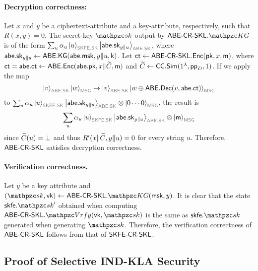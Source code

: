 \paragraph{Decryption correctness:}
Let $x$ and $y$ be a ciphertext-attribute and a key-attribute,
respectively, such that $R(x,y)=0$. The secret-key
$\qsk$ output by $\ABESKL.\qKG$ is of the form $\sum_u \alpha_u
\ket{u}_{\qreg{SKFE.SK}}\ket{\abe.\sk_{y\|u}}_{\qreg{ABE.SK}}$,
where $\mathsf{abe}.\mathsf{sk}_{y\|u}\leftarrow\mathsf{ABE}.\mathsf{KG}(\mathsf{abe}.\mathsf{msk},y\|u,\mathsf{k})$.
Let $\mathsf{ct}\leftarrow\mathsf{ABE}\textrm{-}\mathsf{CR}\textrm{-}\mathsf{SKL}.\mathsf{Enc}(\mathsf{pk},x,\mathsf{m})$, where
$\mathsf{ct}=\mathsf{abe}.\mathsf{ct}\leftarrow\mathsf{ABE}.\mathsf{Enc}(\mathsf{abe}.\mathsf{pk},x\|\widetilde{C},\mathsf{m})$ and
$\widetilde{C}\leftarrow\mathsf{CC}.\mathsf{Sim}(1^\lambda, \mathsf{pp}_D, 1)$.
If we apply the map
\begin{align}
\ket{v}_{\qreg{ABE.SK}}\ket{w}_{\qreg{MSG}}\ra\ket{v}_{\qreg{ABE.SK}}\ket{w\oplus\ABE.\Dec(v,\abe.\ct)}_{\qreg{MSG}}
\end{align}
to $\sum_u \alpha_u \ket{u}_{\qreg{SKFE.SK}}\ket{\abe.\sk_{y\|u}}_{\qreg{ABE.SK}} \tensor \ket{0\cdots0}_{\qreg{MSG}}$, the result is
\begin{align}
\sum_u \alpha_u \ket{u}_{\qreg{SKFE.SK}}\ket{\abe.\sk_{y\|u}}_{\qreg{ABE.SK}} \tensor \ket{\msg}_{\qreg{MSG}}
\end{align}
since $\widetilde{C}(u)=\bot$ and thus $R^\prime(x\|\widetilde{C},y\|u)=0$ for every string $u$.
Therefore, $\mathsf{ABE}\textrm{-}\mathsf{CR}\textrm{-}\mathsf{SKL}$ satisfies decryption correctness.

\paragraph{Verification correctness.}
Let $y$ be a key attribute and $(\qsk,\vk)\gets\ABESKL.\qKG(\msk,y)$.
It is clear that the state $\skfe.\qsk^\prime$ obtained when computing $\ABESKL.\qVrfy(\vk,\qsk)$ is the same as $\skfe.\qsk$ generated when generating $\qsk$.
Therefore, the verification correctness of $\mathsf{ABE}\textrm{-}\mathsf{CR}\textrm{-}\mathsf{SKL}$ follows from that of $\mathsf{SKFE}\textrm{-}\mathsf{CR}\textrm{-}\mathsf{SKL}$.

\subsection{Proof of Selective IND-KLA Security}

